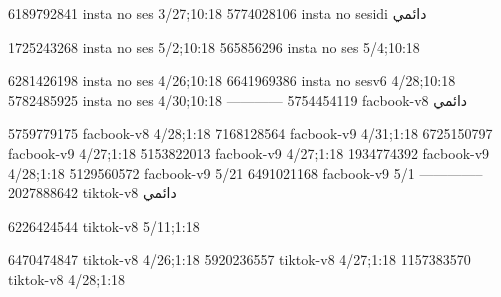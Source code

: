 
6189792841 insta no ses
3/27;10:18
5774028106 insta no sesidi
دائمي


1725243268 insta no ses
5/2;10:18
565856296 insta no ses
5/4;10:18

6281426198 insta no ses
4/26;10:18
6641969386 insta no sesv6
4/28;10:18
5782485925 insta no ses
4/30;10:18
------------
5754454119 facbook-v8
دائمي

5759779175 facbook-v8
4/28;1:18
7168128564 facbook-v9
4/31;1:18
6725150797 facbook-v9
4/27;1:18
5153822013 facbook-v9
4/27;1:18
1934774392 facbook-v9
4/28;1:18
5129560572 facbook-v9
5/21
6491021168 facbook-v9
5/1
--------------
2027888642 tiktok-v8
دائمي

6226424544 tiktok-v8
5/11;1:18

6470474847 tiktok-v8
4/26;1:18
5920236557 tiktok-v8
4/27;1:18
1157383570 tiktok-v8
4/28;1:18

